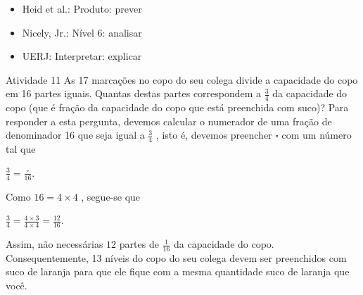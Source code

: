 \begin{multicols}{2}
 \vspace{.1cm}

 \vspace{.1cm}

\begin{itemize} %
  \item     Heid et al.: Produto: prever
  \item     Nicely, Jr.: Nível 6: analisar
  \item     UERJ: Interpretar: explicar
\end{itemize} %

\begin{resposta*}{Atividade 11}
  As 17 marcações no copo do seu colega divide a capacidade do copo em 16 partes
iguais. Quantas destas partes correspondem a   $\frac{3}{4}$   da capacidade do
copo (que é fração da capacidade do copo que está preenchida com suco)? Para
responder a esta pergunta, devemos calcular o numerador de uma fração de
denominador 16 que seja igual a   $\frac{3}{4}$  , isto é, devemos preencher
$\square$   com um número tal que

  $\frac{3}{4} = \frac{\square}{16}$.

  Como   $16 = 4 \times 4$  , segue-se que

  $\frac{3}{4} = \frac{4 \times 3}{4 \times 4} = \frac{12}{16}$.

  Assim, não necessárias   $12$   partes de   $\frac{1}{16}$   da capacidade do
copo. Consequentemente,
  13 níveis do copo do seu colega devem ser preenchidos com suco de laranja para
que ele fique com a mesma quantidade suco de laranja que você.


\begin{center}
\end{center}


\end{resposta*}
\end{multicols}
